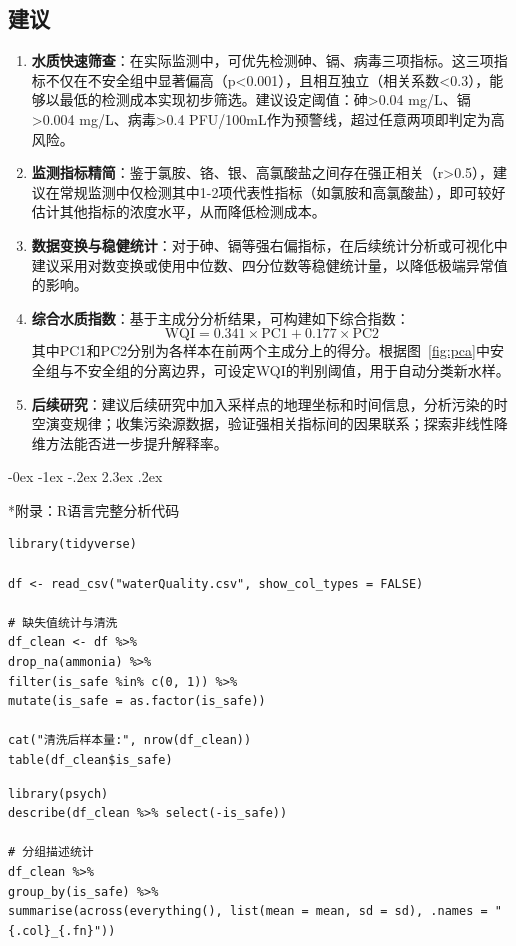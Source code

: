 \documentclass[12pt,a4paper]{ctexart}
\makeatletter
\renewcommand{\section}{\@startsection{section}{1}{\z@}%
{-0ex \@plus -1ex \@minus -.2ex}%
{2.3ex \@plus.2ex}%
{\normalfont\Large\bfseries\raggedright}}
\makeatother
\begin{document}
\subsection{建议}

\begin{enumerate}
    \item \textbf{水质快速筛查}：在实际监测中，可优先检测砷、镉、病毒三项指标。这三项指标不仅在不安全组中显著偏高（p<0.001），且相互独立（相关系数<0.3），能够以最低的检测成本实现初步筛选。建议设定阈值：砷>0.04 mg/L、镉>0.004 mg/L、病毒>0.4 PFU/100mL作为预警线，超过任意两项即判定为高风险。
    \item \textbf{监测指标精简}：鉴于氯胺、铬、银、高氯酸盐之间存在强正相关（r>0.5），建议在常规监测中仅检测其中1-2项代表性指标（如氯胺和高氯酸盐），即可较好估计其他指标的浓度水平，从而降低检测成本。
    \item \textbf{数据变换与稳健统计}：对于砷、镉等强右偏指标，在后续统计分析或可视化中建议采用对数变换或使用中位数、四分位数等稳健统计量，以降低极端异常值的影响。
    \item \textbf{综合水质指数}：基于主成分分析结果，可构建如下综合指数：
    \[
    \text{WQI} = 0.341 \times \text{PC1} + 0.177 \times \text{PC2}
    \]
    其中PC1和PC2分别为各样本在前两个主成分上的得分。根据图~\ref{fig:pca}中安全组与不安全组的分离边界，可设定WQI的判别阈值，用于自动分类新水样。
    \item \textbf{后续研究}：建议后续研究中加入采样点的地理坐标和时间信息，分析污染的时空演变规律；收集污染源数据，验证强相关指标间的因果联系；探索非线性降维方法能否进一步提升解释率。
\end{enumerate}

\newpage
\section*{附录：R语言完整分析代码}

\begin{lstlisting}[caption={01\_data\_clean.R}]
library(tidyverse)

df <- read_csv("waterQuality.csv", show_col_types = FALSE)

# 缺失值统计与清洗
df_clean <- df %>%
drop_na(ammonia) %>%
filter(is_safe %in% c(0, 1)) %>%
mutate(is_safe = as.factor(is_safe))

cat("清洗后样本量:", nrow(df_clean))
table(df_clean$is_safe)
\end{lstlisting}

\begin{lstlisting}[caption={02\_descriptive\_stats.R}]
library(psych)
describe(df_clean %>% select(-is_safe))

# 分组描述统计
df_clean %>%
group_by(is_safe) %>%
summarise(across(everything(), list(mean = mean, sd = sd), .names = "{.col}_{.fn}"))
\end{lstlisting}
\end{document}
